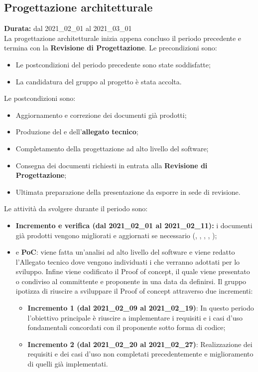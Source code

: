 \subsection{Progettazione architetturale}
\label{progettazione_architetturale}
\textbf{Durata:} dal 2021\_02\_01 al 2021\_03\_01\\
La progettazione architetturale inizia appena concluso il periodo precedente e termina con la \textbf{Revisione di Progettazione}.
Le precondizioni sono:
\begin{itemize}
    \item Le postcondizioni del periodo precedente sono state soddisfatte;
    \item La candidatura del gruppo al progetto {\NomeProgetto} è stata accolta.
\end{itemize}
Le postcondizioni sono:
\begin{itemize}
    \item Aggiornamento e correzione dei documenti già prodotti;
    \item Produzione del  e dell'\textbf{allegato tecnico};
    \item Completamento della progettazione ad alto livello del software;
    \item Consegna dei documenti richiesti in entrata alla \textbf{Revisione di Progettazione};
    \item Ultimata preparazione della presentazione da esporre in sede di revisione.
\end{itemize}
Le attività da svolgere durante il periodo sono:
\begin{itemize}
    \item \textbf{Incremento e verifica (dal 2021\_02\_01 al 2021\_02\_11):} i documenti già prodotti vengono migliorati e aggiornati se necessario ({\NdP}, {\PdP}, {\Glossario}, {\PdQ}, {\AdR});
    \item {} e \textbf{PoC}: viene fatta un'analisi ad alto livello del software e viene redatto l'Allegato tecnico dove vengono individuati i  che verranno adottati per lo sviluppo. Infine viene codificato il Proof of concept, il quale viene presentato o condiviso al committente e proponente in una data da definirsi. Il gruppo ipotizza di riuscire a sviluppare il Proof of concept attraverso due incrementi:
    \begin{itemize}
    	\item \textbf{Incremento 1 (dal 2021\_02\_09 al 2021\_02\_19)}: In questo periodo l'obiettivo principale è riuscire a implementare i requisiti e i casi d'uso fondamentali concordati con il proponente sotto forma di codice;
        \item \textbf{Incremento 2 (dal 2021\_02\_20 al 2021\_02\_27)}: Realizzazione dei requisiti e dei casi d'uso non completati precedentemente e miglioramento di quelli già implementati.
    \end{itemize}
\end{itemize}
\newpage
